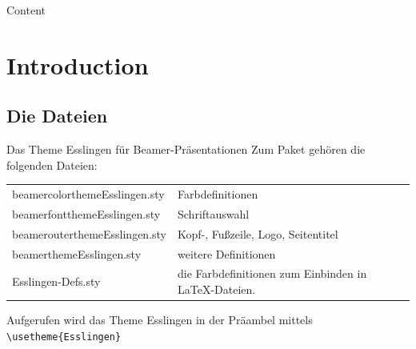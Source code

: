 





\begin{frame}
  \titlepage
\end{frame}

\begin{frame}{Content}
  \tableofcontents
\end{frame}

\section{Introduction}

\subsection{Die Dateien}

\begin{frame}[fragile]{Das Theme Esslingen für Beamer-Präsentationen}
Zum Paket gehören die folgenden Dateien:


\begin{center}
  \begin{tabular}{lp{6cm}}
    beamercolorthemeEsslingen.sty & Farbdefinitionen \\
    beamerfontthemeEsslingen.sty & Schriftauswahl \\
    beamerouterthemeEsslingen.sty & Kopf-, Fußzeile, Logo, Seitentitel\\
    beamerthemeEsslingen.sty & weitere Definitionen \\
    Esslingen-Defs.sty & die Farbdefinitionen zum Einbinden in \LaTeX-Dateien.\\
  \end{tabular}
\end{center}
Aufgerufen wird das Theme Esslingen in der Präambel mittels
\verb+\usetheme{Esslingen}+

\end{frame}

